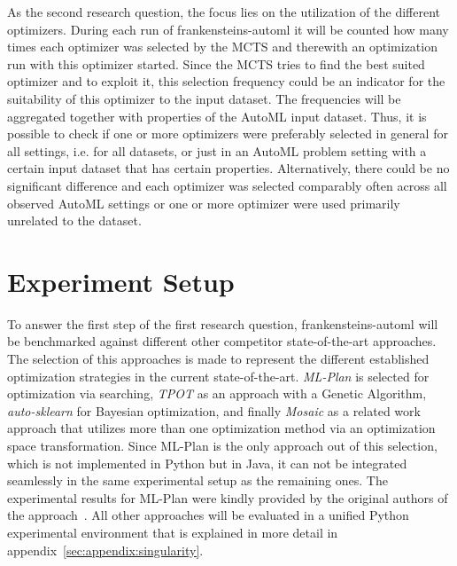 As the second research question, the focus lies on the utilization of the different optimizers.
During each run of frankensteins-automl it will be counted how many times each optimizer was selected by the MCTS and therewith an optimization run with this optimizer started.
Since the MCTS tries to find the best suited optimizer and to exploit it, this selection frequency could be an indicator for the suitability of this optimizer to the input dataset.\newline
The frequencies will be aggregated together with properties of the AutoML input dataset.
Thus, it is possible to check if one or more optimizers were preferably selected in general for all settings, i.e. for all datasets, or just in an AutoML problem setting with a certain input dataset that has certain properties.
Alternatively, there could be no significant difference and each optimizer was selected comparably often across all observed AutoML settings or one or more optimizer were used primarily unrelated to the dataset.

\section{Experiment Setup}
\label{sec:evaluation:setup}
To answer the first step of the first research question, frankensteins-automl will be benchmarked against different other competitor state-of-the-art approaches.
The selection of this approaches is made to represent the different established optimization strategies in the current state-of-the-art.\newline
\textit{ML-Plan} is selected for optimization via searching, \textit{TPOT} as an approach with a Genetic Algorithm, \textit{auto-sklearn} for Bayesian optimization, and finally \textit{Mosaic} as a related work approach that utilizes more than one optimization method via an optimization space transformation.\newline
Since ML-Plan is the only approach out of this selection, which is not implemented in Python but in Java, it can not be integrated seamlessly in the same experimental setup as the remaining ones.
The experimental results for ML-Plan were kindly provided by the original authors of the approach~\textcite{Mohr-ML-Plan}.
All other approaches will be evaluated in a unified Python experimental environment that is explained in more detail in appendix~\ref{sec:appendix:singularity}.

